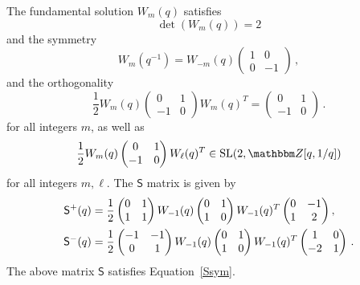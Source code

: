 \documentclass[12pt,reqno]{amsart}
\theoremstyle{definition}
\def\BZ{\mathbbm Z}
\def\SL{\mathrm{SL}}
\def\ms{\mathsf}
\begin{document}
The fundamental solution $W_m(q)$ satisfies
\begin{equation}
  \label{det41}
  \det(W_m(q))=2
\end{equation}
and the symmetry
\begin{equation}
  \label{W41inv}
  W_m(q^{-1}) = W_{-m}(q)
  \begin{pmatrix} 1 & 0 \\ 0 & -1 \end{pmatrix} \,,
\end{equation}
and the orthogonality
\begin{equation}
  \label{WWT41b}
  \frac{1}{2} W_m(q)
  \begin{pmatrix} 0 & 1 \\ -1 & 0 \end{pmatrix}
  W_{m}(q)^T =
  \begin{pmatrix} 0 & 1 \\ -1 & 0 \end{pmatrix} \,.
\end{equation}
for all integers $m$, as well as
\begin{equation}
  \label{WWT41}
  \frac{1}{2} W_m(q)
  \begin{pmatrix} 0 & 1 \\ -1 & 0 \end{pmatrix}
  W_{\ell}(q)^T \in \SL(2,\BZ[q,1/q]) 
\end{equation}
for all integers $m, \ell$. The $\mathsf{S}$ matrix is given by 
\begin{subequations}
  \begin{align}
    \label{S41p}
    \mathsf{S}^+(q)
    &={1\over 2}
      \begin{pmatrix} 0 & 1 \\ 1 & 1 \end{pmatrix}
       W_{-1}(q) \begin{pmatrix} 0 & 1 \\ 1 & 0 \end{pmatrix}W_{-1}(q)^T
  \begin{pmatrix} 0 & -1 \\ 1 & 2 \end{pmatrix},\\
  \label{S41m}
  \mathsf{S}^-(q) &= {1\over 2}
  \begin{pmatrix} -1 & -1 \\ 0 & 1 \end{pmatrix} W_{-1}(q)
  \begin{pmatrix} 0 & 1 \\ 1 & 0 \end{pmatrix}W_{-1}(q)^T
  \begin{pmatrix} 1 & 0 \\ -2 & 1 \end{pmatrix} \,.
\end{align}
\end{subequations}
The above matrix $\ms{S}$ satisfies Equation~\eqref{Ssym}.
\end{document}
